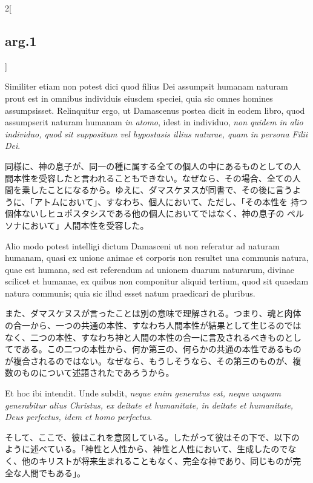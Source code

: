 \documentclass[paper=a4paper,fontsize=10pt,jafontsize=9pt,titlepage]{jlreq}
\begin{document}
\begin{paracol}{2}[\subsection{arg.1}]
\switchcolumn*

Similiter etiam non potest dici quod filius Dei assumpsit humanam
naturam prout est in omnibus individuis eiusdem speciei, quia sic
omnes homines assumpsisset. Relinquitur ergo, ut Damascenus postea
dicit in eodem libro, quod assumpserit naturam humanam {\itshape in
atomo}, idest in individuo, {\itshape non quidem in alio individuo,
quod sit suppositum vel hypostasis illius naturae, quam in persona
Filii Dei}.

\switchcolumn

同様に、神の息子が、同一の種に属する全ての個人の中にあるものとしての人
間本性を受容したと言われることもできない。なぜなら、その場合、全ての人
間を乗したことになるから。ゆえに、ダマスケヌスが同書で、その後に言うよ
うに、「アトムにおいて」、すなわち、個人において、ただし、「その本性を
持つ個体ないしヒュポスタシスである他の個人においてではなく、神の息子の
ペルソナにおいて」人間本性を受容した。

\switchcolumn*

Alio modo potest intelligi dictum Damasceni ut non referatur ad
naturam humanam, quasi ex unione animae et corporis non resultet una
communis natura, quae est humana, sed est referendum ad unionem duarum
naturarum, divinae scilicet et humanae, ex quibus non componitur
aliquid tertium, quod sit quaedam natura communis; quia sic illud
esset natum praedicari de pluribus.

\switchcolumn

また、ダマスケヌスが言ったことは別の意味で理解される。つまり、魂と肉体
の合一から、一つの共通の本性、すなわち人間本性が結果として生じるのでは
なく、二つの本性、すなわち神と人間の本性の合一に言及されるべきものとし
てである。この二つの本性から、何か第三の、何らかの共通の本性であるもの
が複合されるのではない。なぜなら、もうしそうなら、その第三のものが、複
数のものについて述語されたであろうから。

\switchcolumn*

Et hoc ibi intendit. Unde subdit, {\itshape neque enim generatus est,
neque unquam generabitur alius Christus, ex deitate et humanitate, in
deitate et humanitate, Deus perfectus, idem et homo perfectus}.

\switchcolumn

そして、ここで、彼はこれを意図している。したがって彼はその下で、以下の
ように述べている。「神性と人性から、神性と人性において、生成したのでな
く、他のキリストが将来生まれることもなく、完全な神であり、同じものが完
全な人間でもある」。

\switchcolumn*[\subsection{ad.3}]


\end{paracol}
\end{document}
